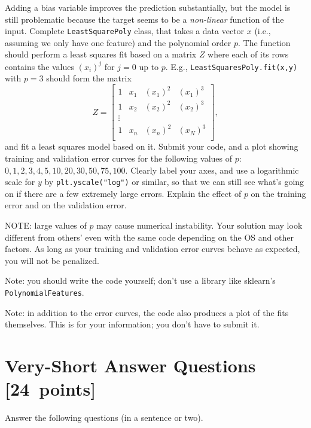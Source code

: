 \documentclass{article}
\newcommand{\blu}[1]{{\textcolor{blu}{#1}}}
\let\ask\blu
\newcommand\pts[1]{\textcolor{pointscolour}{[#1~points]}}
\begin{document}
Adding a bias variable improves the prediction substantially, but the model is still problematic because the target seems to be a \emph{non-linear} function of the input.
Complete \texttt{LeastSquarePoly} class, that takes a data vector $x$ (i.e., assuming we only have one feature) and the polynomial order $p$. The function should perform a least squares fit based on a matrix $Z$ where each of its rows contains the values $(x_{i})^j$ for $j=0$ up to $p$. E.g., \texttt{LeastSquaresPoly.fit(x,y)}  with $p = 3$ should form the matrix
\[
Z =
\left[\begin{array}{cccc}
1 & x_1 & (x_1)^2 & (x_1)^3\\
1 & x_2 & (x_2)^2 & (x_2)^3\\
\vdots\\
1 & x_n & (x_n)^2 & (x_N)^3\\
\end{array}
\right],
\]
and fit a least squares model based on it.
\ask{Submit your code, and a plot showing training and validation error curves for the following values of $p$: $0,1,2,3,4,5,10,20,30,50,75,100$. Clearly label your axes, and use a logarithmic scale for $y$} by \texttt{plt.yscale("log")} or similar, so that we can still see what's going on if there are a few extremely large errors. \ask{Explain the effect of $p$ on the training error and on the validation error.}

NOTE: large values of $p$ may cause numerical instability. Your solution may look different from others' even with the same code depending on the OS and other factors. As long as your training and validation error curves behave as expected, you will not be penalized.

Note: you should write the code yourself; don't use a library like sklearn's \texttt{PolynomialFeatures}.

Note: in addition to the error curves, the code also produces a plot of the fits themselves. This is for your information; you don't have to submit it.


\clearpage
\section{Very-Short Answer Questions \pts{24}}

\ask{Answer the following questions (in a sentence or two).}
\end{document}
